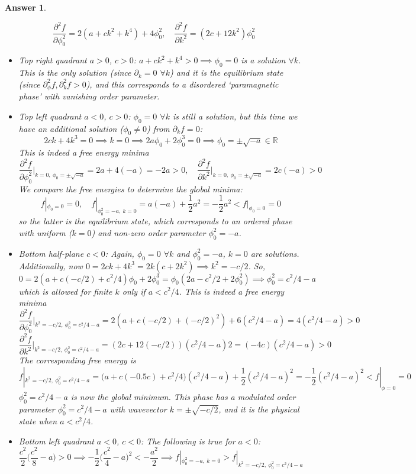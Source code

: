 \documentclass[a4paper]{article}
\newtheorem{ans}{Answer}[section]
\theoremstyle{new}
\begin{document}
\begin{ans}
\begin{enumerate}[label=(\alph*)]
$$\frac{\partial^2f}{\partial\phi_0^2}=2(a+ck^2+k^4)+4\phi_0^2,\quad\frac{\partial^2f}{\partial k^2}=(2c+12k^2)\phi_0^2$$
\begin{itemize}
    \item Top right quadrant $a>0$, $c>0$: $a+ck^2+k^4>0\implies\phi_0=0$ is a solution $\forall k$. This is the only solution (since $\partial_k=0$ $\forall k$) and it is the equilibrium state (since $\partial_\phi^2f,\partial_k^2f>0$), and this corresponds to a disordered `paramagnetic phase' with vanishing order parameter.
    \item Top left quadrant $a<0$, $c>0$: $\phi_0=0$ $\forall k$ is still a solution, but this time we have an additional solution ($\phi_0\neq0$) from $\partial_kf=0$:
    $$2ck+4k^3=0\implies k=0\implies 2a\phi_0+2\phi_0^3=0\implies\phi_0=\pm\sqrt{-a}\in\mathbb{R}$$
    This is indeed a free energy minima
    $$\frac{\partial^2f}{\partial\phi_0^2}\bigg|_{k=0,~\phi_0=\pm\sqrt{-a}}=2a+4(-a)=-2a>0,\quad\frac{\partial^2f}{\partial k^2}\bigg|_{k=0,~\phi_0=\pm\sqrt{-a}}=2c(-a)>0$$
    We compare the free energies to determine the global minima:
    $$f|_{\phi_0=0}=0,\quad f|_{\phi_0^2=-a,~k=0}=a(-a)+\frac{1}{2}a^2=-\frac{1}{2}a^2<f|_{\phi_0=0}=0$$
    so the latter is the equilibrium state, which corresponds to an ordered phase with uniform ($k=0$) and non-zero order parameter $\phi_0^2=-a$.
    \item Bottom half-plane $c<0$: Again, $\phi_0=0$ $\forall k$ and $\phi_0^2=-a$, $k=0$ are solutions. Additionally, now $0=2ck+4k^3=2k(c+2k^2)\implies k^2=-c/2$. So,
    $$0=2(a+c(-c/2)+c^2/4)\phi_0+2\phi_0^3=\phi_0(2a-c^2/2+2\phi_0^2)\implies\phi_0^2=c^2/4-a$$
    which is allowed for finite $k$ only if $a<c^2/4$. This is indeed a free energy minima
    $$\frac{\partial^2f}{\partial\phi_0^2}\bigg|_{k^2=-c/2,~\phi_0^2=c^2/4-a}=2(a+c(-c/2)+(-c/2)^2)+6(c^2/4-a)=4(c^2/4-a)>0$$
    $$\frac{\partial^2f}{\partial k^2}\bigg|_{k^2=-c/2,~\phi_0^2=c^2/4-a}=(2c+12(-c/2))(c^2/4-a)2=(-4c)(c^2/4-a)>0$$
    The corresponding free energy is
    $$f|_{k^2=-c/2,~\phi_0^2=c^2/4-a}=\bigg(a+c(-0.5c)+c^2/4\bigg)(c^2/4-a)+\frac{1}{2}(c^2/4-a)^2=-\frac{1}{2}(c^2/4-a)^2<f|_{\phi=0}=0$$
    $\phi_0^2=c^2/4-a$ is now the global minimum. This phase has a modulated order parameter $\phi_0^2=c^2/4-a$ with wavevector $k=\pm\sqrt{-c/2}$, and it is the physical state when $a<c^2/4$.
    \item Bottom left quadrant $a<0$, $c<0$: The following is true for $a<0$:
    $$\frac{c^2}{2}\bigg(\frac{c^2}{8}-a\bigg)>0\implies-\frac{1}{2}\bigg(\frac{c^2}{4}-a\bigg)^2<-\frac{a^2}{2}\implies f|_{\phi_0^2=-a,~k=0}>f|_{k^2=-c/2,~\phi_0^2=c^2/4-a}$$

\end{itemize}
\end{enumerate}
\end{ans}
\end{document}
